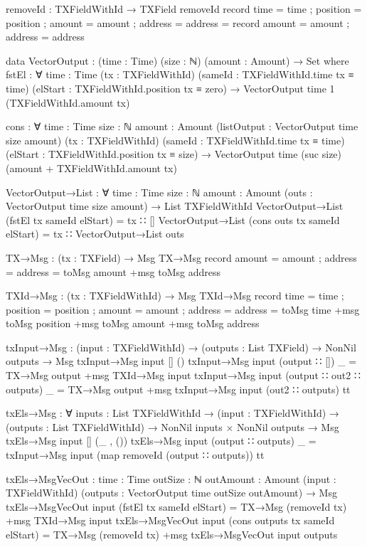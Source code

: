 \documentclass{beamer}
\begin{document}
\begin{code}
    removeId : TXFieldWithId → TXField
    removeId record { time = time ; position = position ; amount = amount ; address = address }
      = record { amount = amount ; address = address }

    data VectorOutput : (time : Time) (size : ℕ) (amount : Amount) → Set where
      fstEl : ∀ {time : Time}
        (tx : TXFieldWithId)
        (sameId : TXFieldWithId.time tx ≡ time)
        (elStart : TXFieldWithId.position tx ≡ zero)
        → VectorOutput time 1 (TXFieldWithId.amount tx)

      cons : ∀ {time : Time} {size : ℕ} {amount : Amount}
        (listOutput : VectorOutput time size amount)
        (tx : TXFieldWithId)
        (sameId : TXFieldWithId.time tx ≡ time)
        (elStart : TXFieldWithId.position tx ≡ size)
        → VectorOutput time (suc size) (amount + TXFieldWithId.amount tx)

    VectorOutput→List : ∀ {time : Time} {size : ℕ} {amount : Amount}
      (outs : VectorOutput time size amount)
      → List TXFieldWithId
    VectorOutput→List (fstEl tx sameId elStart) = tx ∷ []
    VectorOutput→List (cons outs tx sameId elStart) = tx ∷ VectorOutput→List outs

    TX→Msg : (tx : TXField) → Msg
    TX→Msg record { amount = amount ; address = address } = toMsg amount +msg toMsg address

    TXId→Msg : (tx : TXFieldWithId) → Msg
    TXId→Msg record { time = time ; position = position ; amount = amount ; address = address }
      = toMsg time +msg toMsg position +msg toMsg amount +msg toMsg address

    txInput→Msg : (input : TXFieldWithId) → (outputs : List TXField)
      → NonNil outputs → Msg
    txInput→Msg input [] ()
    txInput→Msg input (output ∷ []) _ = TX→Msg output +msg TXId→Msg input
    txInput→Msg input (output ∷ out2 ∷ outputs) _ = TX→Msg output +msg txInput→Msg input (out2 ∷ outputs) tt

    txEls→Msg : ∀ {inputs : List TXFieldWithId}
      → (input : TXFieldWithId) → (outputs : List TXFieldWithId)
      → NonNil inputs × NonNil outputs → Msg
    txEls→Msg input [] (_ , ())
    txEls→Msg input (output ∷ outputs) _ = txInput→Msg input (map removeId (output ∷ outputs)) tt

    txEls→MsgVecOut :
      {time      : Time}
      {outSize   : ℕ}
      {outAmount : Amount}
      (input     : TXFieldWithId)
      (outputs   : VectorOutput time outSize outAmount)
      → Msg
    txEls→MsgVecOut input (fstEl tx sameId elStart) = TX→Msg (removeId tx) +msg TXId→Msg input
    txEls→MsgVecOut input (cons outputs tx sameId elStart) =
      TX→Msg (removeId tx) +msg txEls→MsgVecOut input outputs


\end{code}
\end{document}
